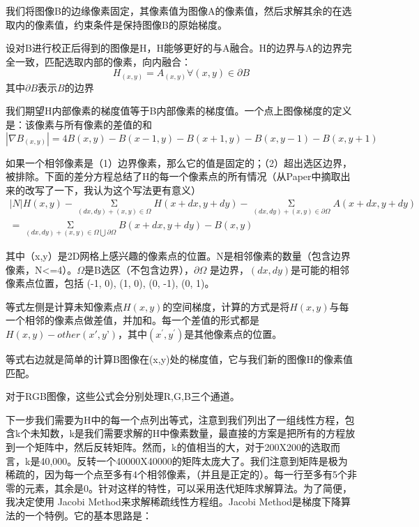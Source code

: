 我们将图像B的边缘像素固定，其像素值为图像A的像素值，然后求解其余的在选取内的像素值，约束条件是保持图像B的原始梯度。

设对B进行校正后得到的图像是H，H能够更好的与A融合。H的边界与A的边界完全一致，匹配选取内部的像素，向内融合：
\begin{equation}
H_{(x,y)} = A_{(x,y)}\forall{(x,y)}\in{\partial{B}}
\end{equation}
其中\(\partial{B}\)表示\(B\)的边界

我们期望H内部像素的梯度值等于B内部像素的梯度值。一个点上图像梯度的定义是：该像素与所有像素的差值的和
\begin{equation}
|\nabla{B_{(x,y)}}| = 4B(x,y) - B(x-1,y) - B(x+1,y) - B(x,y-1) - B(x,y+1)
\end{equation}

如果一个相邻像素是（1）边界像素，那么它的值是固定的；（2）超出选区边界，被排除。下面的差分方程总结了H的每一个像素点的所有情况（从Paper中摘取出来的改写了一下，我认为这个写法更有意义）
\begin{equation}
\begin{aligned}
|N|H(x,y) - \mathop {\Sigma }\limits_{(dx,dy)+(x,y) \in{\Omega}}H(x+dx,y+dy)
-\mathop {\Sigma }\limits_{(dx,dy)+(x,y) \in{\partial{\Omega}}}A(x+dx,y+dy) \\
= \mathop {\Sigma }\limits_{(dx,dy)+(x,y) \in{\Omega \bigcup {\partial{\Omega}}}}
B(x+dx,y+dy) - B(x,y)
\end{aligned}
\end{equation}

其中（x,y）是2D网格上感兴趣的像素点的位置。N是相邻像素的数量（包含边界像素，N<=4）。\(\Omega\)是B选区（不包含边界），\(\partial \Omega\) 是边界，\((dx, dy)\)是可能的相邻像素点位置，包括 {(-1, 0), (1, 0), (0, -1), (0, 1)}。

等式左侧是计算未知像素点\(H(x, y)\)的空间梯度，计算的方式是将\(H(x,y)\)与每一个相邻的像素点做差值，并加和。每一个差值的形式都是\(H(x, y) - other(x', y’)\)，其中\((x^', y^')\)是其他像素点的位置。

等式右边就是简单的计算B图像在(x,y)处的梯度值，它与我们新的图像H的像素值匹配。

对于RGB图像，这些公式会分别处理R,G,B三个通道。

下一步我们需要为H中的每一个点列出等式，注意到我们列出了一组线性方程，包含k个未知数，k是我们需要求解的H中像素数量，最直接的方案是把所有的方程放到一个矩阵中，然后反转矩阵。然而，k的值相当的大，对于200X200的选取而言，k是40,000。反转一个40000X40000的矩阵太庞大了。我们注意到矩阵是极为稀疏的，因为每一个点至多有4个相邻像素，（并且是正定的）。每一行至多有5个非零的元素，其余是0。针对这样的特性，可以采用迭代矩阵求解算法。为了简便，我决定使用 Jacobi Method来求解稀疏线性方程组。Jacobi Method是梯度下降算法的一个特例。它的基本思路是：

